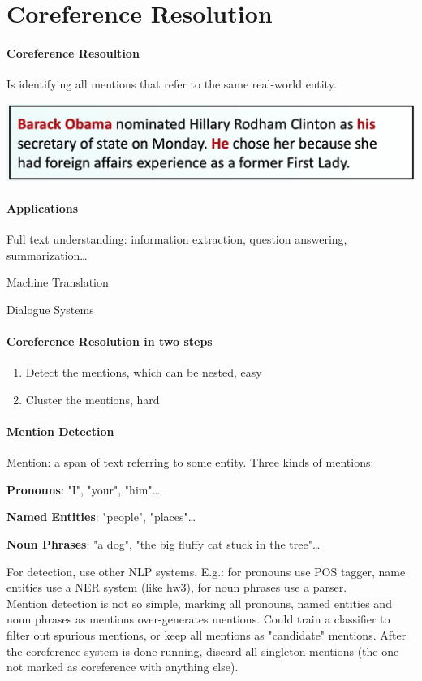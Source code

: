 \documentclass[10pt]{report}
\begin{document}
\section{Coreference Resolution}
\paragraph{Coreference Resoultion} Is identifying all mentions that refer to the same real-world entity.
\begin{center}
	\includegraphics[scale=0.5]{101.png}
\end{center}
\paragraph{Applications}
\begin{list}{}{}
	\item Full text understanding: information extraction, question answering, summarization\ldots
	\item Machine Translation
	\item Dialogue Systems
\end{list}
\paragraph{Coreference Resolution in two steps}
\begin{enumerate}
	\item Detect the mentions, which can be nested, easy
	\item Cluster the mentions, hard
\end{enumerate}
\paragraph{Mention Detection} Mention: a span of text referring to some entity. Three kinds of mentions:
\begin{list}{}{}
	\item \textbf{Pronouns}: "I", "your", "him"\ldots
	\item \textbf{Named Entities}: "people", "places"\ldots
	\item \textbf{Noun Phrases}: "a dog", "the big fluffy cat stuck in the tree"\ldots
\end{list}
For detection, use other NLP systems. E.g.: for pronouns use POS tagger, name entities use a NER system (like hw3), for noun phrases use a parser.\\
Mention detection is not so simple, marking all pronouns, named entities and noun phrases as mentions over-generates mentions. Could train a classifier to filter out spurious mentions, or keep all mentions as "candidate" mentions. After the coreference system is done running, discard all singleton mentions (the one not marked as coreference with anything else).
\end{document}
